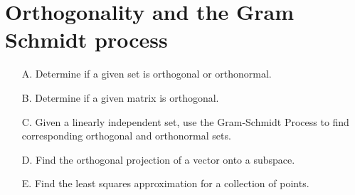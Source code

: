 \section{Orthogonality and the Gram Schmidt process}

\begin{outcome}

\begin{enumerate}

\item[A.] Determine if a given set is orthogonal or orthonormal.

\item[B.] Determine if a given matrix is orthogonal.

\item[C.] Given a linearly independent set, use the Gram-Schmidt Process to find corresponding orthogonal and orthonormal sets. 

\item[D.] Find the orthogonal projection of a vector onto a subspace.

\item[E.] Find the least squares approximation for a collection of points.
\end{enumerate}
\end{outcome}
